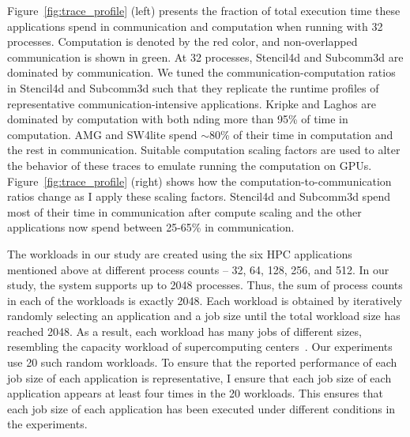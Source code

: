 Figure~\ref{fig:trace_profile} (left) presents the fraction of total execution
time these applications spend in communication and computation when running
with 32 processes.  Computation is denoted by the red color, and non-overlapped
communication is shown in green. At 32 processes, Stencil4d and Subcomm3d are
dominated by communication. We tuned the communication-computation ratios in
Stencil4d and Subcomm3d such that they replicate the runtime profiles of
representative communication-intensive applications.  Kripke and Laghos are
dominated by computation with both nding more than 95\% of time in computation.
AMG and SW4lite spend $\sim$80\% of their time in computation and the rest in
communication.  Suitable
computation scaling factors are used to alter the behavior of these traces to
emulate running the computation on GPUs. Figure~\ref{fig:trace_profile} (right)
shows how the computation-to-communication ratios change as I apply these
scaling factors. Stencil4d and Subcomm3d spend most of their time in
communication after compute scaling and the other applications now spend
between 25-65\% in communication.

The workloads in our study are created using the six HPC applications mentioned
above at different process counts -- 32, 64, 128, 256, and 512.  In our study,
the system supports up to 2048 processes. Thus, the sum of process counts in
each of the workloads is exactly 2048.  Each workload is obtained by
iteratively randomly selecting an application and a job size until the total
workload size has reached 2048.  As a result, each workload has many jobs of
different sizes, resembling the capacity workload of supercomputing
centers~\cite{jain2016evaluating}.  Our experiments use 20 such random
workloads. To ensure that the reported performance of each job size of each
application is representative, I ensure that each job size of each application
appears at least four times in the 20 workloads. This ensures that each job
size of each application has been executed under different conditions in the
experiments.
 
